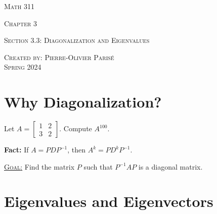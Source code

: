 \documentclass[20pt,a4paper]{extarticle}
\newcounter{example}
\begin{document}
\thispagestyle{empty}

\begin{center}
\vspace*{0.75cm}

{\Huge \textsc{Math 311}}

\vspace*{1.5cm}

{\LARGE \textsc{Chapter 3}} 

\vspace*{0.75cm}

\noindent\textsc{Section 3.3: Diagonalization and Eigenvalues}

\vspace*{0.25cm}

\tableofcontents

\vfill

\noindent \textsc{Created by: Pierre-Olivier Paris{\'e}} \\
\textsc{Spring 2024}
\end{center}

\newpage

\section{Why Diagonalization?}

\begin{example}\label{Ex:PowerOfAMatrix}
Let $A = \begin{bmatrix} 1 & 2 \\ 3 & 2 \end{bmatrix}$. Compute $A^{100}$.
\end{example}

\begin{solution}

\end{solution}

\vfill 

\textbf{Fact:} If $A = P D P^{-1}$, then $A^k = P D^k P^{-1}$. 

\underline{\textsc{Goal}:} Find the matrix $P$ such that $P^{-1} A P$ is a diagonal matrix.

\newpage 

\section{Eigenvalues and Eigenvectors}
\end{document}
